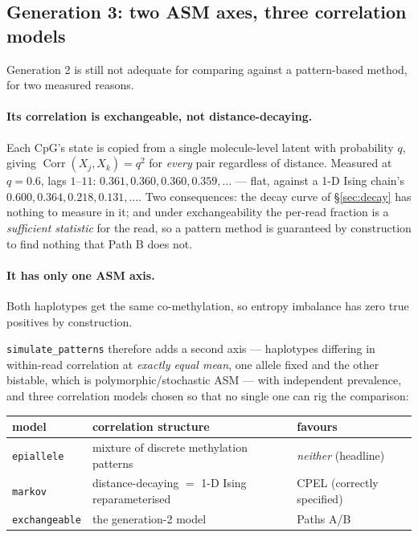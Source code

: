 \documentclass[11pt]{article}
\DeclareMathOperator{\Corr}{Corr}
\begin{document}
\subsection{Generation 3: two ASM axes, three correlation models}

Generation 2 is still not adequate for comparing against a pattern-based method,
for two measured reasons.

\paragraph{Its correlation is exchangeable, not distance-decaying.} Each CpG's
state is copied from a single molecule-level latent with probability $q$, giving
$\Corr(X_j, X_k) = q^2$ for \emph{every} pair regardless of distance. Measured at
$q = 0.6$, lags $1$--$11$: $0.361, 0.360, 0.360, 0.359, \ldots$ --- flat, against
a 1-D Ising chain's $0.600, 0.364, 0.218, 0.131, \ldots$. Two consequences: the
decay curve of \S\ref{sec:decay} has nothing to measure in it; and under
exchangeability the per-read fraction is a \emph{sufficient statistic} for the
read, so a pattern method is guaranteed by construction to find nothing that
Path B does not.

\paragraph{It has only one ASM axis.} Both haplotypes get the same
co-methylation, so entropy imbalance has zero true positives by construction.

\texttt{simulate\_patterns} therefore adds a second axis --- haplotypes differing
in within-read correlation at \emph{exactly equal mean}, one allele fixed and the
other bistable, which is polymorphic/stochastic ASM --- with independent
prevalence, and three correlation models chosen so that no single one can rig the
comparison:

\begin{center}
\small
\begin{tabular}{lll}
\toprule
model & correlation structure & favours \\
\midrule
\texttt{epiallele} & mixture of discrete methylation patterns & \emph{neither} (headline) \\
\texttt{markov} & distance-decaying $=$ 1-D Ising reparameterised & CPEL (correctly specified) \\
\texttt{exchangeable} & the generation-2 model & Paths A/B \\
\bottomrule
\end{tabular}
\end{center}
\end{document}
